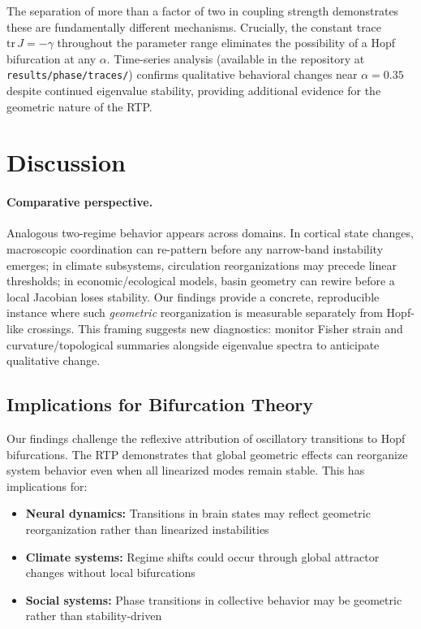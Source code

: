 \documentclass[11pt,twocolumn]{article}
\begin{document}
The separation of more than a factor of two in coupling strength demonstrates these are fundamentally different
mechanisms. Crucially, the constant trace $\mathrm{tr}\,J = -\gamma$ throughout the parameter range eliminates
the possibility of a Hopf bifurcation at any $\alpha$. Time-series analysis (available in the repository at
\texttt{results/phase/traces/}) confirms qualitative behavioral changes near $\alpha = 0.35$ despite continued
eigenvalue stability, providing additional evidence for the geometric nature of the RTP.

\section{Discussion}

\paragraph{Comparative perspective.}
Analogous two-regime behavior appears across domains. In cortical state changes, macroscopic coordination can re-pattern before any narrow-band instability emerges; in climate subsystems, circulation reorganizations may precede linear thresholds; in economic/ecological models, basin geometry can rewire before a local Jacobian loses stability. Our findings provide a concrete, reproducible instance where such \emph{geometric} reorganization is measurable separately from Hopf-like crossings. This framing suggests new diagnostics: monitor Fisher strain and curvature/topological summaries alongside eigenvalue spectra to anticipate qualitative change.

\subsection{Implications for Bifurcation Theory}

Our findings challenge the reflexive attribution of oscillatory transitions to Hopf bifurcations. The RTP
demonstrates that global geometric effects can reorganize system behavior even when all linearized modes remain
stable. This has implications for:

\begin{itemize}
  \item \textbf{Neural dynamics:} Transitions in brain states may reflect geometric reorganization rather than
        linearized instabilities
  \item \textbf{Climate systems:} Regime shifts could occur through global attractor changes without local
        bifurcations
  \item \textbf{Social systems:} Phase transitions in collective behavior may be geometric rather than
        stability-driven
\end{itemize}
\end{document}
